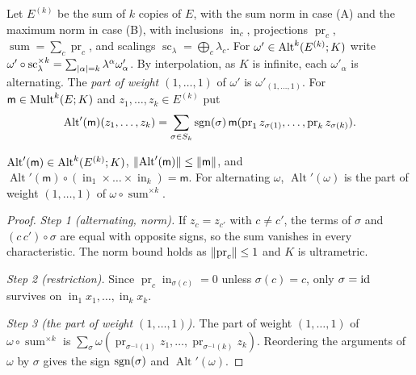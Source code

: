 Let $E^{(k)}$ be the sum of $k$ copies of $E$, with the sum norm in case (A) and the maximum norm in case (B), with inclusions $\operatorname{in}_c$, projections $\operatorname{pr}_c$, $\operatorname{sum}=\sum_c\operatorname{pr}_c$, and scalings $\operatorname{sc}_\lambda=\bigoplus_c\lambda_c$. For $\omega'\in\operatorname{Alt}^k(E^{(k)};K)$ write $\omega'\circ\operatorname{sc}_\lambda^{\times k}=\sum_{\lvert \alpha\rvert=k}\lambda^\alpha\omega'_\alpha$. By interpolation, as $K$ is infinite, each $\omega'_\alpha$ is alternating. The \emph{part of weight $(1,\dots,1)$} of $\omega'$ is $\omega'_{(1,\dots,1)}$. For $\mathsf m\in\operatorname{Mult}^k(E;K)$ and $z_1,\dots,z_k\in E^{(k)}$ put
\[
 \operatorname{Alt}'(\mathsf m)(z_1,\dots,z_k)=\sum_{\sigma\in S_k}\operatorname{sgn}(\sigma)\,\mathsf m(\operatorname{pr}_1z_{\sigma(1)},\dots,\operatorname{pr}_kz_{\sigma(k)}).
\]

\begin{lemma}[generation]\label{amb:lem:generation}
$\operatorname{Alt}'(\mathsf m)\in\operatorname{Alt}^k(E^{(k)};K)$, $\lVert \operatorname{Alt}'(\mathsf m)\rVert\le\lVert \mathsf m\rVert$, and $\operatorname{Alt}'(\mathsf m)\circ(\operatorname{in}_1\times\dots\times\operatorname{in}_k)=\mathsf m$. For alternating $\omega$, $\operatorname{Alt}'(\omega)$ is the part of weight $(1,\dots,1)$ of $\omega\circ\operatorname{sum}^{\times k}$.
\end{lemma}

\begin{proof}
\emph{Step 1 (alternating, norm).} If $z_c=z_{c'}$ with $c\ne c'$, the terms of $\sigma$ and $(c\,c')\circ\sigma$ are equal with opposite signs, so the sum vanishes in every characteristic. The norm bound holds as $\lVert \operatorname{pr}_c\rVert\le1$ and $K$ is ultrametric.

\emph{Step 2 (restriction).} Since $\operatorname{pr}_c\operatorname{in}_{\sigma(c)}=0$ unless $\sigma(c)=c$, only $\sigma=\mathrm{id}$ survives on $\operatorname{in}_1x_1,\dots,\operatorname{in}_kx_k$.

\emph{Step 3 (the part of weight $(1,\dots,1)$).} The part of weight $(1,\dots,1)$ of $\omega\circ\operatorname{sum}^{\times k}$ is $\sum_{\sigma}\omega(\operatorname{pr}_{\sigma^{-1}(1)}z_1,\dots,\operatorname{pr}_{\sigma^{-1}(k)}z_k)$. Reordering the arguments of $\omega$ by $\sigma$ gives the sign $\operatorname{sgn}(\sigma)$ and $\operatorname{Alt}'(\omega)$.
\end{proof}

